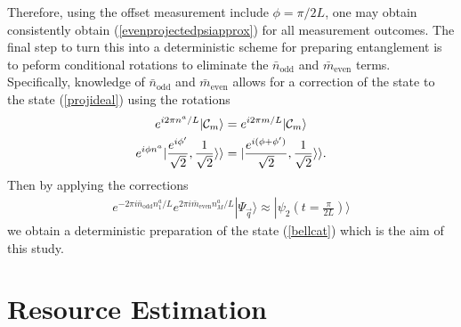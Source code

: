 \documentclass[%
  prx,%
  twocolumn,%
  preprintnumbers,%
  amsmath,%
  amssymb,%
  superscriptaddress%
]{revtex4}
\begin{document}
Therefore, using the offset measurement include $ \phi = \pi/2L$, one may obtain consistently obtain (\ref{evenprojectedpsiapprox}) for all measurement outcomes.  The final step to turn this into a deterministic scheme for preparing entanglement is to peform conditional rotations to eliminate the $ \bar{n}_\text{odd} $ and  $ \bar{m}_\text{even} $ terms.  Specifically, knowledge of $ \bar{n}_\text{odd} $ and  $ \bar{m}_\text{even} $  allows for a correction of the state to the state (\ref{projideal}) using the rotations
%
\begin{align}
e^{i 2 \pi n^a /L } | {\cal C}_m \rangle & = e^{i 2 \pi m /L } | {\cal C}_m \rangle \label{correction1} \\
e^{i \phi n^a } |\frac{e^{ i \phi' }}{\sqrt{2}},\frac{1}{\sqrt{2}}\rangle\rangle & = |\frac{e^{ i (\phi+\phi')  }}{\sqrt{2}},\frac{1}{\sqrt{2}}\rangle\rangle .
\label{correction2}
\end{align}
%
Then by applying the corrections
%
\begin{align}
e^{-2 \pi i \bar{n}_{\text{odd}}  n^a_1/L }  e^{2 \pi i \bar{m}_{\text{even}}  n^a_M/L }  | \Psi_{\vec{q}} \rangle \approx | \psi_2 (t= \frac{\pi}{2L} ) \rangle
\label{correction3}
\end{align}
%
we obtain a deterministic preparation of the state (\ref{bellcat}) which is the aim of this study.

















\section{Resource Estimation}
\end{document}
